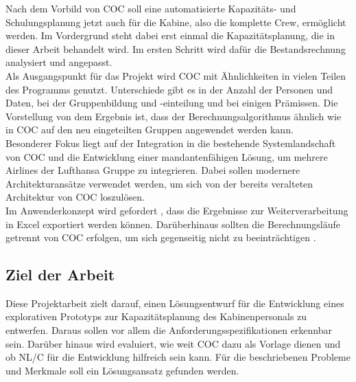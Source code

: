 \documentclass [12pt, a4paper, oneside, titlepage, ngerman]{article}
\begin{document}
\noindent Nach dem Vorbild von \ac{COC} soll eine automatisierte Kapazitäts- und Schulungsplanung jetzt auch für die Kabine, also die komplette Crew, ermöglicht werden. Im Vordergrund steht dabei erst einmal die Kapazitätsplanung, die in dieser Arbeit behandelt wird. Im ersten Schritt wird dafür die Bestandsrechnung analysiert und angepasst.\\ %
Als Ausgangspunkt für das Projekt wird \ac{COC} mit Ähnlichkeiten in vielen Teilen des Programms genutzt. Unterschiede gibt es in der Anzahl der Personen und Daten, bei der Gruppenbildung und -einteilung und bei einigen Prämissen. Die Vorstellung von dem Ergebnis ist, dass der Berechnungsalgorithmus ähnlich wie in \ac{COC} auf den neu eingeteilten Gruppen angewendet werden kann. \\

\noindent Besonderer Fokus liegt auf der Integration in die bestehende Systemlandschaft von \ac{COC} und die Entwicklung einer mandantenfähigen Lösung, um mehrere Airlines der Lufthansa Gruppe zu integrieren. Dabei sollen modernere Architekturansätze verwendet werden, um sich von der bereits veralteten Architektur von \ac{COC} loszulösen. \\
Im Anwenderkonzept wird gefordert , dass die Ergebnisse zur Weiterverarbeitung in Excel exportiert werden können. Darüberhinaus sollten die Berechnungsläufe getrennt von \ac{COC} erfolgen, um sich gegenseitig nicht zu beeinträchtigen \cite[vgl. dazu][]{anwenderkonzept}.

\subsection {Ziel der Arbeit} 
Diese Projektarbeit zielt darauf, einen Lösungsentwurf für die Entwicklung eines explorativen Prototyps zur Kapazitätsplanung des Kabinenpersonals zu entwerfen. Daraus sollen vor allem die Anforderungsspezifikationen erkennbar sein. Darüber hinaus wird evaluiert, wie weit \ac{COC} dazu als Vorlage dienen und ob \ac{NL/C} für die Entwicklung hilfreich sein kann. Für die beschriebenen Probleme und Merkmale soll ein Lösungsansatz gefunden werden.
\end{document}
